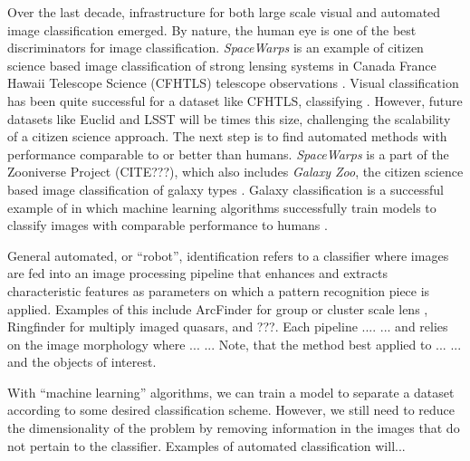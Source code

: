 \documentclass{emulateapj}
\begin{document}
Over the last decade, infrastructure for both large scale visual and
automated image classification emerged. By nature, the human eye is
one of the best discriminators for image classification.  {\em
  SpaceWarps} is an example of citizen science based image
classification of strong lensing systems in Canada France Hawaii
Telescope Science (CFHTLS) telescope observations
\citep{marshall_etal16,more_etal16}.  Visual classification has been
quite successful for a dataset like CFHTLS, classifying .  However, future datasets like Euclid and LSST will be
 times this size, challenging the scalability of a citizen
science approach.  The next step is to find automated methods with
performance comparable to or better than humans. {\em SpaceWarps} is a
part of the Zooniverse Project (CITE???), which also includes {\em
  Galaxy Zoo}, the citizen science based image classification of
galaxy types \citep{lintott_etal08}.  Galaxy classification is a
successful example of in which machine learning algorithms
successfully train models to classify images with comparable
performance to humans \citep{dieleman_etal15}.

General automated, or ``robot'', identification refers to a classifier
where images are fed into an image processing pipeline that enhances
and extracts characteristic features as parameters on which a pattern
recognition piece is applied.  Examples of this include ArcFinder for
group or cluster scale lens \citep{seidelandbartelmann_07}, Ringfinder
for multiply imaged quasars\citep{gavazzi_etal14}, and ???.  Each
pipeline .... ... and relies on the image morphology where ... ...
Note, that the method best applied to ... ... and the objects of
interest.

With ``machine learning'' algorithms, we can train a model to separate
a dataset according to some desired classification scheme.  However,
we still need to reduce the dimensionality of the problem by removing
information in the images that do not pertain to the classifier.
Examples of automated classification will...
\end{document}

